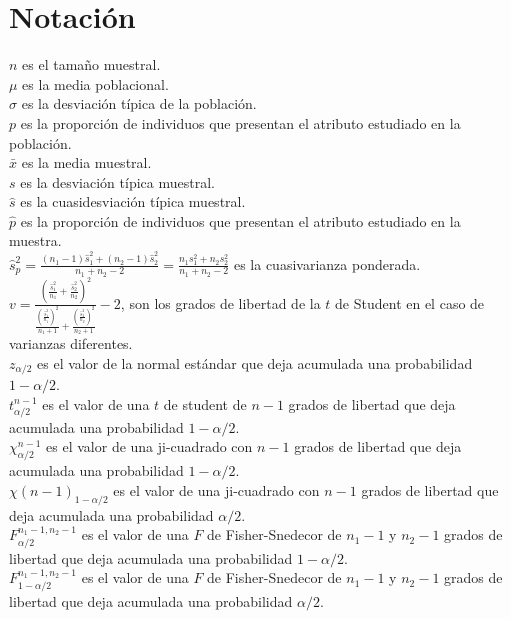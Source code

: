 \documentclass[a4paper,landscape]{article}
\begin{document}
\section*{\color{blueceu}Notación}
\noindent $n$ es el tamaño muestral.\\
$\mu$ es la media poblacional.\\
$\sigma$ es la desviación típica de la población.\\
$p$ es la proporción de individuos que presentan el atributo estudiado en la población.\\
$\bar{x}$ es la media muestral.\\
$s$ es la desviación típica muestral.\\
$\hat s$ es la cuasidesviación típica muestral.\\
$\hat{p}$ es la proporción de individuos que presentan el atributo estudiado en la muestra.\\
$\displaystyle \hat s^2_p=\frac{(n_{1}-1)\hat s^2_1+(n_{2}-1)\hat s^2_2}{n_{1}+n_{2}-2}=
\frac{n_{1}s^2_{1}+n_{2}s^2_{2}}{n_{1}+n_{2}-2}$ es la cuasivarianza ponderada.\\
$v=\frac{\left(\frac{\hat s^2_1}{n_{1}}+
          \frac{\hat s^2_2}{n_{2}}\right)^2}
         {\frac{\left(\frac{\hat s^2_1}{n_{1}}\right)^2}{n_{1}+1}+
          \frac{\left(\frac{\hat s^2_2}{n_{2}}\right)^2}{n_{2}+1}} -2$, son los
          grados de libertad de la $t$ de Student en el caso de varianzas
          diferentes.\\
$z_{\alpha/2}$ es el valor de la normal estándar que deja acumulada
una probabilidad $1-\alpha/2$.\\
$t^{n-1}_{\alpha/2}$ es el valor de una $t$ de student de $n-1$
grados de libertad que deja acumulada una probabilidad
$1-\alpha/2$.\\
$\chi^{n-1}_{\alpha/2}$ es el valor de una ji-cuadrado con $n-1$
grados de libertad que deja acumulada una probabilidad $1-\alpha/2$.\\
$\chi(n-1)_{1-\alpha/2}$ es el valor de una ji-cuadrado con $n-1$
grados de libertad que deja acumulada una probabilidad $\alpha/2$.\\
$F^{n_{1}-1,n_{2}-1}_{\alpha/2}$ es el valor de una $F$ de
Fisher-Snedecor de $n_1-1$ y $n_2-1$ grados de libertad que deja acumulada una
probabilidad $1-\alpha/2$.\\
$F^{n_{1}-1,n_{2}-1}_{1-\alpha/2}$ es el valor de una $F$ de
Fisher-Snedecor de $n_1-1$ y $n_2-1$ grados de libertad que deja acumulada una
probabilidad $\alpha/2$.
\end{document}
